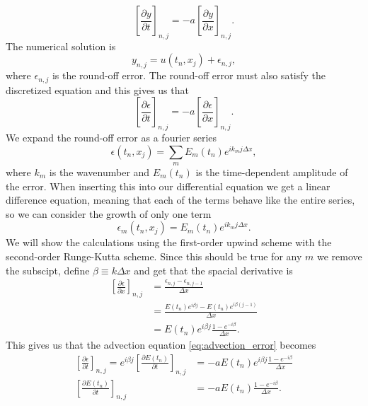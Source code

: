 \begin{equation}
    \left[\frac{\partial y}{\partial t}\right]_{n,j} = -a \left[\frac{\partial y}{\partial x}\right]_{n,j}.
\end{equation}
The numerical solution is
\begin{equation}
    y_{n,j} = u(t_n,x_j)+\epsilon_{n,j},
\end{equation}
where $\epsilon_{n,j}$ is the round-off error. The round-off error must also satisfy the discretized equation and this gives us that
\begin{equation}\label{eq:advection_error}
    \left[\frac{\partial \epsilon}{\partial t}\right]_{n,j} = -a \left[\frac{\partial \epsilon}{\partial x}\right]_{n,j}.
\end{equation}
We expand the round-off error as a fourier series
\begin{equation}
    \epsilon(t_n,x_j) = \sum_m E_m(t_n) e^{i k_m j\Delta x},
\end{equation}
where $k_m$ is the wavenumber and $E_m(t_n)$ is the time-dependent amplitude of the error. When inserting this into our differential equation we get a linear difference equation, meaning that each of the terms behave like the entire series, so we can consider the growth of only one term
\begin{equation}
    \epsilon_m(t_n,x_j) = E_m(t_n) e^{i k_m j\Delta x}.
\end{equation}
We will show the calculations using the first-order upwind scheme with the second-order Runge-Kutta scheme. Since this should be true for any $m$ we remove the subscipt, define $\beta\equiv k\Delta x$ and get that the spacial derivative is
\begin{align*}
    \left[\frac{\partial \epsilon}{\partial x}\right]_{n,j} &= \frac{\epsilon_{n,j}-\epsilon_{n,j-1}}{\Delta x}\\
    &= \frac{E(t_n) e^{i \beta j}- E(t_n) e^{i \beta (j-1)}}{\Delta x}\\
    &= E(t_n)e^{i\beta j} \frac{1-e^{-i\beta}}{\Delta x}.
\end{align*}
This gives us that the advection equation \ref{eq:advection_error} becomes
\begin{align}
    \left[\frac{\partial \epsilon}{\partial t}\right]_{n,j} = e^{i\beta j}\left[\frac{\partial E(t_n)}{\partial t}\right]_{n,j} &= -a E(t_n)e^{i\beta j} \frac{1-e^{-i\beta}}{\Delta x}\\
    \left[\frac{\partial E(t_n)}{\partial t}\right]_{n,j} &= -a E(t_n)\frac{1-e^{-i\beta}}{\Delta x}.
\end{align}
